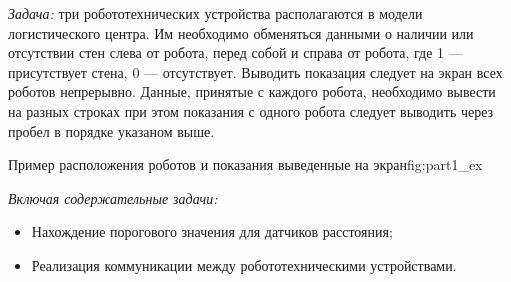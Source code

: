 
\textit{Задача:} три робототехнических устройства располагаются в модели логистического центра.
Им необходимо обменяться данными о наличии или отсутствии стен слева от робота, перед собой и справа от робота,
где 1 --- присутствует стена, 0 --- отсутствует. Выводить показация следует на экран всех роботов непрерывно.
Данные, принятые с каждого робота, необходимо вывести на разных строках при этом показания с одного робота
следует выводить через пробел в порядке указаном выше.

{Пример расположения роботов и показания выведенные на экран}{fig:part1_ex}

\textit{Включая содержательные задачи:}
\begin{itemize}
    \item Нахождение порогового значения для датчиков расстояния;
    \item Реализация коммуникации между робототехническими устройствами.
\end{itemize}

